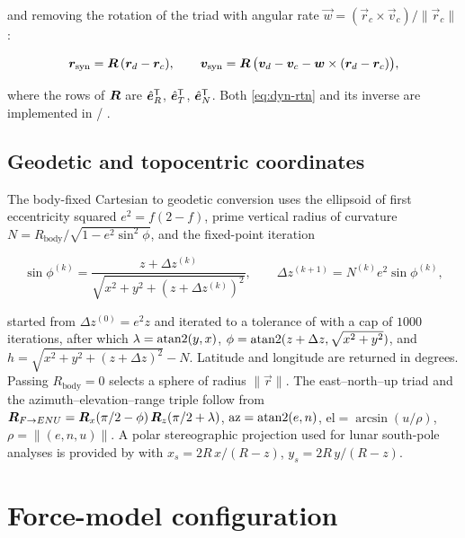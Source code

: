 and removing the rotation of the triad with angular rate
$\vec{w} = (\vec{r}_c\times\vec{v}_c)/\lVert\vec{r}_c\rVert$:

\begin{equation}
  \label{eq:dyn-rtn}
  \bm{r}_\mathrm{syn} = \bm{R}\,(\bm{r}_d-\bm{r}_c),
  \qquad
  \bm{v}_\mathrm{syn} = \bm{R}\,\bigl(\bm{v}_d-\bm{v}_c-\bm{w}\times(\bm{r}_d-\bm{r}_c)\bigr),
\end{equation}

where the rows of $\bm{R}$ are $\hat{\bm{e}}_R^{\mathsf{T}}$, $\hat{\bm{e}}_T^{\mathsf{T}}$,
$\hat{\bm{e}}_N^{\mathsf{T}}$. Both \cref{eq:dyn-rtn} and its inverse are implemented in
 / .

\subsection{Geodetic and topocentric coordinates}
\label{sec:dyn-geodetic}

The body-fixed Cartesian to geodetic conversion uses the ellipsoid of
first eccentricity squared $e^2 = f(2-f)$, prime vertical radius of curvature
$N = R_\mathrm{body}/\sqrt{1-e^2\sin^2\phi}$, and the fixed-point iteration

\begin{equation}
  \label{eq:dyn-lla}
  \sin\phi^{(k)} = \frac{z+\Delta z^{(k)}}{\sqrt{x^2+y^2+(z+\Delta z^{(k)})^2}},
  \qquad
  \Delta z^{(k+1)} = N^{(k)} e^2 \sin\phi^{(k)},
\end{equation}

started from $\Delta z^{(0)} = e^2 z$ and iterated to a tolerance of
 with a cap of $1000$ iterations, after which
$\lambda=\operatorname{atan2}(y,x)$, $\phi=\operatorname{atan2}(z+\Delta z,\sqrt{x^2+y^2})$, and
$h=\sqrt{x^2+y^2+(z+\Delta z)^2}-N$. Latitude and longitude are returned in
degrees. Passing $R_\mathrm{body}=0$ selects a sphere of radius
$\lVert\vec{r}\rVert$. The east--north--up triad and the azimuth--elevation--range
triple follow from
$\bm{R}_{F\rightarrow ENU} = \bm{R}_x(\pi/2-\phi)\,\bm{R}_z(\pi/2+\lambda)$,
$\mathrm{az}=\operatorname{atan2}(e,n)$, $\mathrm{el}=\arcsin(u/\rho)$,
$\rho=\lVert(e,n,u)\rVert$. A polar stereographic projection used for lunar
south-pole analyses is provided by  with
$x_s = 2R\,x/(R-z)$, $y_s = 2R\,y/(R-z)$.

\section{Force-model configuration}
\label{sec:dyn-config}

